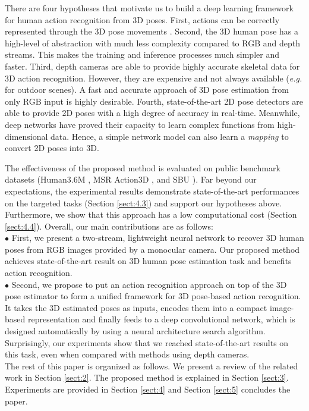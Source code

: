 \documentclass{bmvc2k}
\begin{document}
There are four hypotheses that motivate us to build a deep learning framework for human action recognition from 3D poses. First, actions can be correctly represented through the 3D pose movements \cite{johansson1975visual,gu2010action}. Second, the 3D human pose has a high-level of abstraction with much less complexity compared to RGB and depth streams. This makes the training and inference processes much simpler and faster. Third, depth cameras are able to provide highly accurate skeletal data for 3D action recognition. However, they are expensive and not always available (\textit{e.g.} for outdoor scenes). A fast and accurate approach of 3D pose estimation from only RGB input is highly desirable. Fourth, state-of-the-art 2D pose detectors \cite{cao2017realtime,10.1007/978-3-319-46484-8_29} are able to provide 2D poses with a high degree of accuracy in real-time. Meanwhile, deep networks have proved their capacity to learn complex functions from high-dimensional data. Hence, a simple network model can also learn a \textit{mapping} to convert 2D poses into 3D. 

The effectiveness of the proposed method is evaluated on public benchmark datasets (Human3.6M \cite{6682899}, MSR Action3D \cite{li2010action}, and SBU \cite{yun2012two}). Far beyond our expectations, the experimental results demonstrate state-of-the-art performances on the targeted tasks (Section \ref{sect:4.3}) and support our hypotheses above. Furthermore, we show that this approach has a low computational cost (Section \ref{sect:4.4}). Overall, our main contributions are as follows: \\[0.15cm]
\hspace*{0.5cm} $\bullet$ First, we present a two-stream, lightweight neural network to recover 3D human poses from RGB images provided by a monocular camera. Our proposed method achieves state-of-the-art result on 3D human pose estimation task and benefits action recognition.\\[0.15cm]
\hspace*{0.5cm} $\bullet$ Second, we propose to put an action recognition approach on top of the 3D pose estimator to form a unified framework for 3D pose-based action recognition. It takes the 3D estimated poses as inputs, encodes them into a compact image-based representation and finally feeds to a deep convolutional network, which is designed automatically by using a neural architecture search algorithm. Surprisingly, our experiments show that we reached state-of-the-art results on this task, even when compared with methods using depth cameras.\\[0.15cm]
The rest of this paper is organized as follows. We present a review of the related work in Section \ref{sect:2}. The proposed method is explained in Section \ref{sect:3}. Experiments are provided in Section \ref{sect:4} and Section \ref{sect:5} concludes the paper.\\[-0.75cm]
\end{document}
